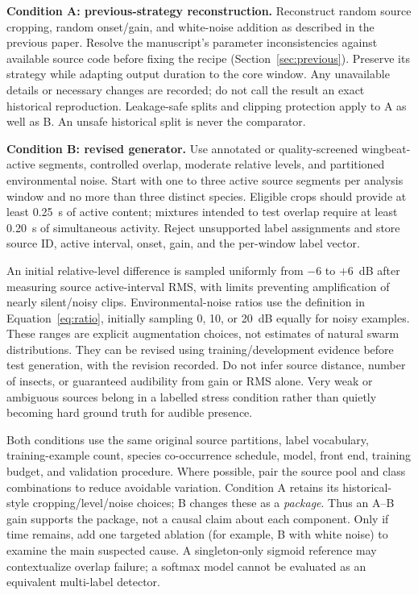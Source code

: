 \documentclass[a4paper,11pt]{article}
\begin{document}
\textbf{Condition A: previous-strategy reconstruction.} Reconstruct random source cropping, random onset/gain, and white-noise addition as described in the previous paper. Resolve the manuscript's parameter inconsistencies against available source code before fixing the recipe (Section~\ref{sec:previous}). Preserve its strategy while adapting output duration to the core window. Any unavailable details or necessary changes are recorded; do not call the result an exact historical reproduction. Leakage-safe splits and clipping protection apply to A as well as B. An unsafe historical split is never the comparator.

\textbf{Condition B: revised generator.} Use annotated or quality-screened wingbeat-active segments, controlled overlap, moderate relative levels, and partitioned environmental noise. Start with one to three active source segments per analysis window and no more than three distinct species. Eligible crops should provide at least 0.25~s of active content; mixtures intended to test overlap require at least 0.20~s of simultaneous activity. Reject unsupported label assignments and store source ID, active interval, onset, gain, and the per-window label vector.

An initial relative-level difference is sampled uniformly from $-6$ to $+6$~dB after measuring source active-interval RMS, with limits preventing amplification of nearly silent/noisy clips. Environmental-noise ratios use the definition in Equation~\ref{eq:ratio}, initially sampling 0, 10, or 20~dB equally for noisy examples. These ranges are explicit augmentation choices, not estimates of natural swarm distributions. They can be revised using training/development evidence before test generation, with the revision recorded. Do not infer source distance, number of insects, or guaranteed audibility from gain or RMS alone. Very weak or ambiguous sources belong in a labelled stress condition rather than quietly becoming hard ground truth for audible presence.

Both conditions use the same original source partitions, label vocabulary, training-example count, species co-occurrence schedule, model, front end, training budget, and validation procedure. Where possible, pair the source pool and class combinations to reduce avoidable variation. Condition A retains its historical-style cropping/level/noise choices; B changes these as a \emph{package}. Thus an A--B gain supports the package, not a causal claim about each component. Only if time remains, add one targeted ablation (for example, B with white noise) to examine the main suspected cause. A singleton-only sigmoid reference may contextualize overlap failure; a softmax model cannot be evaluated as an equivalent multi-label detector.
\end{document}

